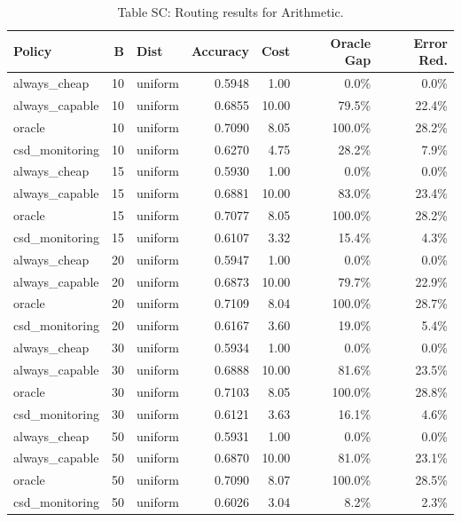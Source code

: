 \documentclass[11pt]{article}
\begin{document}
\begin{table}[h]\centering\scriptsize
\caption{Table S{C}: Routing results for Arithmetic.}
\begin{tabular}{l|r|l|r|r|r|r}
\toprule
Policy & B & Dist & Accuracy & Cost & Oracle Gap & Error Red. \\
\midrule
always\_cheap & 10 & uniform & 0.5948 & 1.00 & 0.0\% & 0.0\% \\
\midrule
always\_capable & 10 & uniform & 0.6855 & 10.00 & 79.5\% & 22.4\% \\
\midrule
oracle & 10 & uniform & 0.7090 & 8.05 & 100.0\% & 28.2\% \\
\midrule
csd\_monitoring & 10 & uniform & 0.6270 & 4.75 & 28.2\% & 7.9\% \\
\midrule
always\_cheap & 15 & uniform & 0.5930 & 1.00 & 0.0\% & 0.0\% \\
\midrule
always\_capable & 15 & uniform & 0.6881 & 10.00 & 83.0\% & 23.4\% \\
\midrule
oracle & 15 & uniform & 0.7077 & 8.05 & 100.0\% & 28.2\% \\
\midrule
csd\_monitoring & 15 & uniform & 0.6107 & 3.32 & 15.4\% & 4.3\% \\
\midrule
always\_cheap & 20 & uniform & 0.5947 & 1.00 & 0.0\% & 0.0\% \\
\midrule
always\_capable & 20 & uniform & 0.6873 & 10.00 & 79.7\% & 22.9\% \\
\midrule
oracle & 20 & uniform & 0.7109 & 8.04 & 100.0\% & 28.7\% \\
\midrule
csd\_monitoring & 20 & uniform & 0.6167 & 3.60 & 19.0\% & 5.4\% \\
\midrule
always\_cheap & 30 & uniform & 0.5934 & 1.00 & 0.0\% & 0.0\% \\
\midrule
always\_capable & 30 & uniform & 0.6888 & 10.00 & 81.6\% & 23.5\% \\
\midrule
oracle & 30 & uniform & 0.7103 & 8.05 & 100.0\% & 28.8\% \\
\midrule
csd\_monitoring & 30 & uniform & 0.6121 & 3.63 & 16.1\% & 4.6\% \\
\midrule
always\_cheap & 50 & uniform & 0.5931 & 1.00 & 0.0\% & 0.0\% \\
\midrule
always\_capable & 50 & uniform & 0.6870 & 10.00 & 81.0\% & 23.1\% \\
\midrule
oracle & 50 & uniform & 0.7090 & 8.07 & 100.0\% & 28.5\% \\
\midrule
csd\_monitoring & 50 & uniform & 0.6026 & 3.04 & 8.2\% & 2.3\% \\
\midrule

\end{tabular}
\end{table}
\end{document}
